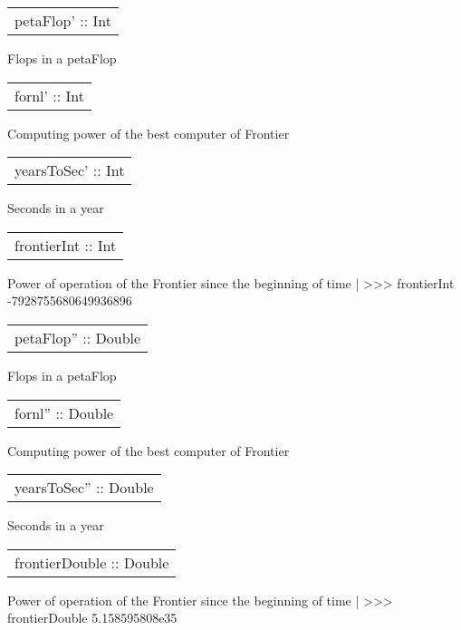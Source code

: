 \begin{haddockdesc}
\item[\begin{tabular}{@{}l}
petaFlop' :: Int
\end{tabular}]
{\haddockbegindoc
Flops in a petaFlop\par}
\end{haddockdesc}
\begin{haddockdesc}
\item[\begin{tabular}{@{}l}
fornl' :: Int
\end{tabular}]
{\haddockbegindoc
Computing power of the best computer of Frontier\par}
\end{haddockdesc}
\begin{haddockdesc}
\item[\begin{tabular}{@{}l}
yearsToSec' :: Int
\end{tabular}]
{\haddockbegindoc
Seconds in a year\par}
\end{haddockdesc}
\begin{haddockdesc}
\item[\begin{tabular}{@{}l}
frontierInt :: Int
\end{tabular}]
{\haddockbegindoc
Power of operation of the Frontier since the beginning of time
 | >>> frontierInt
 -7928755680649936896\par}
\end{haddockdesc}
\begin{haddockdesc}
\item[\begin{tabular}{@{}l}
petaFlop'' :: Double
\end{tabular}]
{\haddockbegindoc
Flops in a petaFlop\par}
\end{haddockdesc}
\begin{haddockdesc}
\item[\begin{tabular}{@{}l}
fornl'' :: Double
\end{tabular}]
{\haddockbegindoc
Computing power of the best computer of Frontier\par}
\end{haddockdesc}
\begin{haddockdesc}
\item[\begin{tabular}{@{}l}
yearsToSec'' :: Double
\end{tabular}]
{\haddockbegindoc
Seconds in a year\par}
\end{haddockdesc}
\begin{haddockdesc}
\item[\begin{tabular}{@{}l}
frontierDouble :: Double
\end{tabular}]
{\haddockbegindoc
Power of operation of the Frontier since the beginning of time
 | >>> frontierDouble
 5.158595808e35\par}
\end{haddockdesc}
